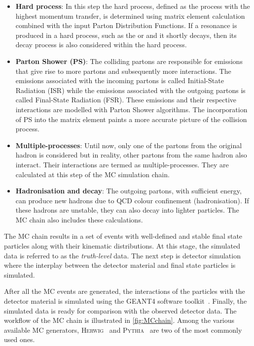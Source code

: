 \begin{itemize}
  \item \textbf{Hard process}: In this step the hard process, defined as the process with the highest
  momentum transfer, is determined using matrix element calculation combined with the input Parton
  Distribution Functions. If a resonance is produced in a hard process, such as the \Ptop or \PZ and it
  shortly decays, then its decay process is also considered within the hard process. 

  \item \textbf{Parton Shower (PS)}: The colliding partons are responsible for emissions that give rise
  to more partons and subsequently more interactions. The emissions associated with the incoming partons
  is called Initial-State Radiation (ISR) while the emissions associated with the outgoing partons is called
  Final-State Radiation (FSR). These emissions and their respective interactions are modelled with
  Parton Shower algorithms. The incorporation of PS into the matrix element paints a more accurate picture
  of the collision process.

  \item \textbf{Multiple-processes}: Until now, only one of the partons from the original hadron is 
  considered but in reality, other partons from the same hadron also interact. Their interactions are
  termed as multiple-processes. They are calculated at this step of the MC simulation chain.
  
  \item \textbf{Hadronisation and decay}: The outgoing partons, with sufficient energy, can produce 
  new hadrons due to QCD colour confinement (hadronisation). If these hadrons are unstable, they can also
  decay into lighter particles. The MC chain also includes these calculations.
\end{itemize}

The MC chain results in a set of events with well-defined and stable final state particles along
with their kinematic distributions. At this stage, the simulated data is referred to as the 
\textit{truth-level} data. The next step is detector simulation where the interplay between the
detector material and final state particles is simulated. 


After all the MC events are generated, the interactions of the particles with the detector material is
simulated using the \textsc{GEANT4} software toolkit~\cite{Agostinelli:2002hh}.
Finally, the simulated data is ready for comparison with the observed detector data. The workflow of 
the MC chain is illustrated in \cref{fig:MCchain}.
Among the various available MC generators, \textsc{Herwig}~\cite{Bellm:2015jjp} and 
\textsc{Pythia}~\cite{Sjostrand:2007gs} are two of the most commonly used ones.


